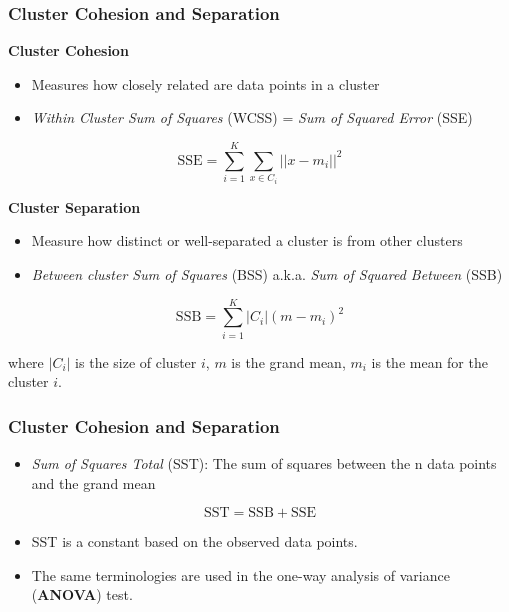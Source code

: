 \documentclass[aspectratio=169, 10pt]{beamer}
\begin{document}

\begin{frame}
    \frametitle{Cluster Cohesion and Separation}
    
    \textbf{Cluster Cohesion}
    \begin{itemize}
        \item Measures how closely related are data points in a cluster
        \item \textit{Within Cluster Sum of Squares} (WCSS) = \textit{Sum of Squared Error} (SSE)
    \end{itemize}

    \[
        \text{SSE} = \sum^{K}_{i=1} \sum_{x \in C_i} ||x - m_i||^2
    \]

    \textbf{Cluster Separation}
    \begin{itemize}
        \item Measure how distinct or well-separated a cluster is from other clusters
        \item \textit{Between cluster Sum of Squares} (BSS) a.k.a. \textit{Sum of Squared Between} (SSB)
    \end{itemize}

    \[
        \text{SSB} = \sum^{K}_{i=1} |C_i|(m - m_i)^2
    \]

    where $|C_i|$ is the size of cluster $i$, $m$ is the grand mean, $m_i$ is the mean for the cluster $i$.
    
\end{frame}

\begin{frame}
    \frametitle{Cluster Cohesion and Separation}

    \begin{itemize}
        \item \textit{Sum of Squares Total} (SST): The sum of squares between the n data points and the grand mean
    \end{itemize}

    \[
        \text{SST} = \text{SSB} + \text{SSE}
    \]

    \begin{itemize}
        \item SST is a constant based on the observed data points. 
        \item The same terminologies are used in the one-way analysis of variance (\textbf{ANOVA}) test.
    \end{itemize}
        
\end{frame}
\end{document}
